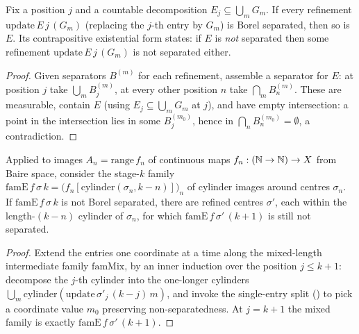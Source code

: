 \begin{lemma}\label{thm:dst-sepfam-split}
  \leanok
  Fix a position \(j\) and a countable decomposition \(E_j\subseteq\bigcup_m G_m\). If every
  refinement \(\mathrm{update}\,E\,j\,(G_m)\) (replacing the \(j\)-th entry by \(G_m\)) is Borel
  separated, then so is \(E\). Its contrapositive existential form
  states: if \(E\) is \emph{not} separated then some refinement \(\mathrm{update}\,E\,j\,(G_m)\) is
  not separated either.
\end{lemma}
\begin{proof}\leanok
  Given separators \(B^{(m)}\) for each refinement, assemble a separator for \(E\): at position
  \(j\) take \(\bigcup_m B^{(m)}_j\), at every other position \(n\) take \(\bigcap_m B^{(m)}_n\).
  These are measurable, contain \(E\) (using \(E_j\subseteq\bigcup_m G_m\) at \(j\)), and have
  empty intersection: a point in the intersection lies in some \(B^{(m_0)}_j\), hence in
  \(\bigcap_n B^{(m_0)}_n=\emptyset\), a contradiction.
\end{proof}

\begin{lemma}\label{thm:dst-stage-step}
  \leanok
  Applied to images \(A_n=\mathrm{range}\,f_n\) of continuous maps \(f_n:(\mathbb{N}\to\mathbb{N})\to X\) from Baire
  space, consider the stage-\(k\) family
  \(\mathrm{famE}\,f\,\sigma\,k=\bigl(f_n[\mathrm{cylinder}(\sigma_n,k-n)]\bigr)_n\) of
  cylinder images around centres \(\sigma_n\). If \(\mathrm{famE}\,f\,\sigma\,k\) is not Borel
  separated, there are refined centres \(\sigma'\), each within the length-\((k-n)\) cylinder of
  \(\sigma_n\), for which \(\mathrm{famE}\,f\,\sigma'\,(k+1)\) is still not separated.
\end{lemma}
\begin{proof}\leanok
  Extend the entries one coordinate at a time along the mixed-length intermediate family
  \(\mathrm{famMix}\), by an inner induction over the position \(j\le k+1\): decompose the
  \(j\)-th cylinder into the one-longer cylinders \(\bigcup_m\mathrm{cylinder}(\mathrm{update}\,
  \sigma'_j\,(k-j)\,m)\), and invoke the single-entry split
  () to pick a coordinate value \(m_0\) preserving non-separatedness.
  At \(j=k+1\) the mixed family is exactly \(\mathrm{famE}\,f\,\sigma'\,(k+1)\).
\end{proof}

